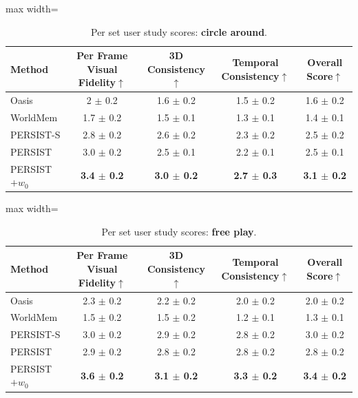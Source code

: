 \begin{subappendices}
\begin{table}[htb!]
\centering
\caption{Per set user study scores: \textbf{circle around}.}
\begin{adjustbox}{max width=\linewidth}
\begin{tabular}{lcccc}
\toprule
Method & Per Frame Visual Fidelity$\uparrow$ & 3D Consistency$\uparrow$ & Temporal Consistency$\uparrow$ & Overall Score$\uparrow$ \\
\midrule
Oasis & 2 $\pm$ 0.2 & 1.6 $\pm$ 0.2 & 1.5 $\pm$ 0.2 & 1.6 $\pm$ 0.2 \\
WorldMem & 1.7 $\pm$ 0.2 & 1.5 $\pm$ 0.1 & 1.3 $\pm$ 0.1 & 1.4 $\pm$ 0.1 \\
PERSIST-S & 2.8 $\pm$ 0.2 & 2.6 $\pm$ 0.2 & 2.3 $\pm$ 0.2 & 2.5 $\pm$ 0.2 \\
PERSIST & 3.0 $\pm$ 0.2 & 2.5 $\pm$ 0.1 & 2.2 $\pm$ 0.1 & 2.5 $\pm$ 0.1 \\
PERSIST$+w_0$ & \textbf{3.4 $\pm$ 0.2} & \textbf{3.0 $\pm$ 0.2} & \textbf{2.7 $\pm$ 0.3} & \textbf{3.1 $\pm$ 0.2} \\
\bottomrule
\end{tabular}
\end{adjustbox}
\label{c4:tab:user_study_scores_circle_around}
\end{table}

\begin{table}[htb!]
\centering
\caption{Per set user study scores: \textbf{free play}.}
\label{c4:tab:user_study_scores_free_play}
\begin{adjustbox}{max width=\linewidth}
\begin{tabular}{lcccc}
\toprule
Method & Per Frame Visual Fidelity$\uparrow$ & 3D Consistency$\uparrow$ & Temporal Consistency$\uparrow$ & Overall Score$\uparrow$ \\
\midrule
Oasis & 2.3 $\pm$ 0.2 & 2.2 $\pm$ 0.2 & 2.0 $\pm$ 0.2 & 2.0 $\pm$ 0.2 \\
WorldMem & 1.5 $\pm$ 0.2 & 1.5 $\pm$ 0.2 & 1.2 $\pm$ 0.1 & 1.3 $\pm$ 0.1 \\
PERSIST-S & 3.0 $\pm$ 0.2 & 2.9 $\pm$ 0.2 & 2.8 $\pm$ 0.2 & 3.0 $\pm$ 0.2 \\
PERSIST & 2.9 $\pm$ 0.2 & 2.8 $\pm$ 0.2 & 2.8 $\pm$ 0.2 & 2.8 $\pm$ 0.2 \\
PERSIST$+w_0$ & \textbf{3.6 $\pm$ 0.2} & \textbf{3.1 $\pm$ 0.2} & \textbf{3.3 $\pm$ 0.2} & \textbf{3.4 $\pm$ 0.2} \\
\bottomrule
\end{tabular}
\end{adjustbox}
\end{table}


\end{subappendices}

